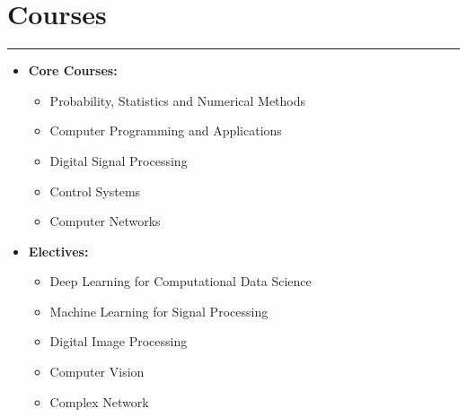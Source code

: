 \documentclass[11pt]{article}
\newlength{\sectionvspace}
\begin{document}
\section*{\bf Courses}
\vspace{\sectionvspace}
\rule{\textwidth}{0.4pt}
\begin{itemize}[leftmargin=*,noitemsep,topsep=0pt]
	\item \textbf{Core Courses:}
	\begin{itemize}[leftmargin=1em,noitemsep,topsep=0pt]
	
		
		\item Probability, Statistics and Numerical Methods
		
		\item Computer Programming and Applications
		
		\item Digital Signal Processing
		
		
		\item Control Systems
		
		\item Computer Networks
		
	\end{itemize}
	\item \textbf{Electives:} 
	\begin{itemize}[leftmargin=1em,noitemsep,topsep=0pt]
		\item Deep Learning for Computational Data Science
		
		\item Machine Learning for Signal Processing
		
		\item Digital Image Processing
		
		\item Computer Vision
		
		\item Complex Network
	\end{itemize}
	
\end{itemize}
	
\end{document}
